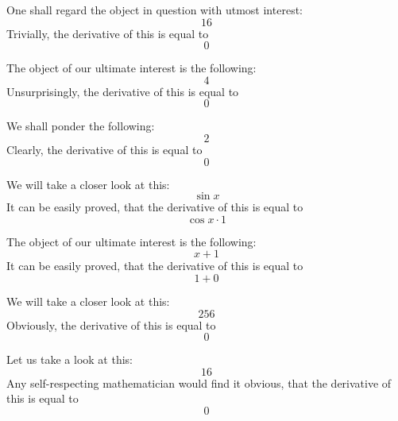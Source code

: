 \documentclass{article}
\begin{document}
One shall regard the object in question with utmost interest:
\begin{equation}
16 
\end{equation}
Trivially, the derivative of this is equal to
\begin{equation}
0 
\end{equation}

The object of our ultimate interest is the following:
\begin{equation}
4 
\end{equation}
Unsurprisingly, the derivative of this is equal to
\begin{equation}
0 
\end{equation}

We shall ponder the following:
\begin{equation}
2 
\end{equation}
Clearly, the derivative of this is equal to
\begin{equation}
0 
\end{equation}

We will take a closer look at this:
\begin{equation}
\sin x 
\end{equation}
It can be easily proved, that the derivative of this is equal to
\begin{equation}
\cos x \cdot 1 
\end{equation}

The object of our ultimate interest is the following:
\begin{equation}
x + 1 
\end{equation}
It can be easily proved, that the derivative of this is equal to
\begin{equation}
1 + 0 
\end{equation}

We will take a closer look at this:
\begin{equation}
256 
\end{equation}
Obviously, the derivative of this is equal to
\begin{equation}
0 
\end{equation}

Let us take a look at this:
\begin{equation}
16 
\end{equation}
Any self-respecting mathematician would find it obvious, that the derivative of this is equal to
\begin{equation}
0 
\end{equation}
\end{document}
